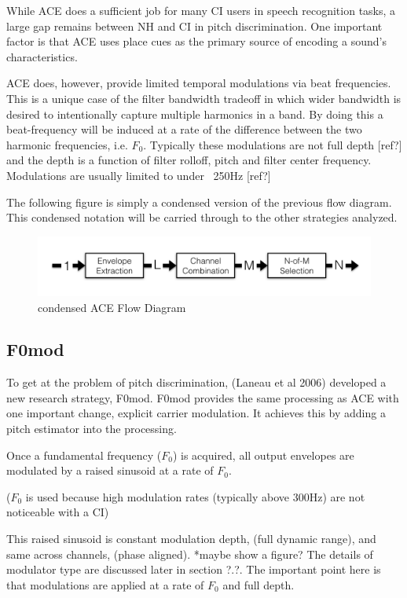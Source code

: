 \documentclass [11pt, proquest] {uwthesis}[2015/03/03]
\begin{document}
While ACE does a sufficient job for many CI users in speech recognition tasks, a large gap remains between NH and CI in pitch discrimination.  One important factor is that ACE uses place cues as the primary source of encoding a sound's characteristics.

ACE does, however, provide limited temporal modulations via beat frequencies.  This is a unique case of the filter bandwidth tradeoff in which wider bandwidth is desired to intentionally capture multiple harmonics in a band.  By doing this a beat-frequency will be induced at a rate of the difference between the two harmonic frequencies, i.e. $F_0$.  Typically these modulations are not full depth [ref?] and the depth is a function of filter rolloff, pitch and filter center frequency.  Modulations are usually limited to under ~250Hz [ref?]

The following figure is simply a condensed version of the previous flow diagram.  This condensed notation will be carried through to the other strategies analyzed.

\begin{figure}[!ht]
  \centering
    \includegraphics[width=1\textwidth]{ACE_flow_diagramTEMP}   
    \caption{condensed ACE Flow Diagram}
\end{figure}

\subsection{F0mod}

To get at the problem of pitch discrimination, (Laneau et al 2006) developed a new research strategy, F0mod.  F0mod provides the same processing as ACE with one important change, explicit carrier modulation.  It achieves this by adding a pitch estimator into the processing.

Once a fundamental frequency ($F_0$) is acquired, all output envelopes are modulated by a raised sinusoid at a rate of $F_0$.  

($F_0$ is used because high modulation rates (typically above 300Hz) are not noticeable with a CI)

This raised sinusoid is constant modulation depth, (full dynamic range), and same across channels, (phase aligned).  *maybe show a figure?  The details of modulator type are discussed later in section ?.?.  The important point here is that modulations are applied at a rate of $F_0$ and full depth.
\end{document}
